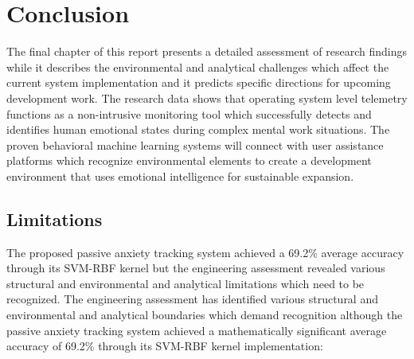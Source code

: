 \chapter{Conclusion}
\label{ch:conclusion}

The final chapter of this report presents a detailed assessment of research findings while it describes the environmental and analytical challenges which affect the current system implementation and it predicts specific directions for upcoming development work. The research data shows that operating system level telemetry functions as a non-intrusive monitoring tool which successfully detects and identifies human emotional states during complex mental work situations. The proven behavioral machine learning systems will connect with user assistance platforms which recognize environmental elements to create a development environment that uses emotional intelligence for sustainable expansion.

\section{Limitations}
\label{sec:limitation}
The proposed passive anxiety tracking system achieved a 69.2\% average accuracy through its SVM-RBF kernel but the engineering assessment revealed various structural and environmental and analytical limitations which need to be recognized. The engineering assessment has identified various structural and environmental and analytical boundaries which demand recognition although the passive anxiety tracking system achieved a mathematically significant average accuracy of 69.2\% through its SVM-RBF kernel implementation:

